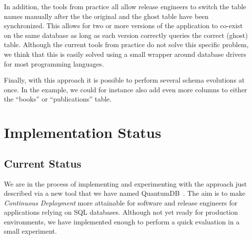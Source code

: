 \documentclass[conference]{IEEEtran}
\begin{document}
In addition, the tools from practice all allow release engineers to switch the table names manually after the the original and the ghost table have been synchronized. This allows for two or more versions of the application to co-exist on the same database as long as each version correctly queries the correct (ghost) table. Although the current tools from practice do not solve this specific problem, we think that this is easily solved using a small wrapper around database drivers for most programming languages.

Finally, with this approach it is possible to perform several schema evolutions at once. In the example, we could for instance also add even more columns to either the ``books'' or ``publications'' table.

\section{Implementation Status} %

\subsection{Current Status}

We are in the process of implementing and experimenting with the approach just described via a new tool that we have named QuantumDB~\cite{QuantumDB}.
The aim is to make \textit{Continuous Deployment} more attainable for software and release engineers for applications relying on SQL databases. Although not yet ready for production environments, we have implemented enough to perform a quick evaluation in a small experiment. 
\end{document}
